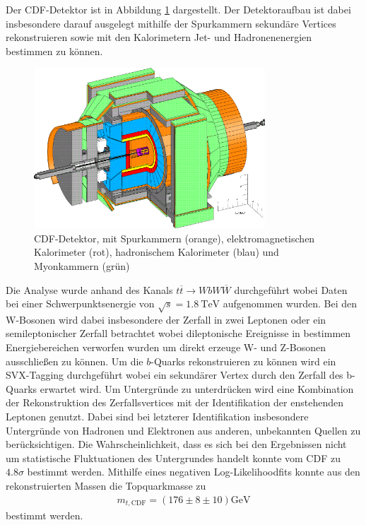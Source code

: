 Der CDF-Detektor ist in Abbildung \ref{fig:cdf} dargestellt.
Der Detektoraufbau ist dabei insbesondere darauf ausgelegt mithilfe der Spurkammern sekundäre Vertices rekonstruieren  sowie mit den Kalorimetern Jet- und Hadronenenergien bestimmen zu können.
\begin{figure}
  \centering
  \includegraphics[height=6.0cm]{ressources/cdfii_3d_p1.png}
  \caption{CDF-Detektor, mit Spurkammern (orange), elektromagnetischen Kalorimeter (rot), hadronischem Kalorimeter (blau) und Myonkammern (grün) \cite{Galtieri:2011yd}}
  \label{fig:cdf}
\end{figure}
Die Analyse wurde anhand des Kanals $t \overline{t} \rightarrow W b W \overline{W}$ durchgeführt wobei Daten bei einer Schwerpunktsenergie von $\sqrt{s} = \SI{1.8}{\tera\electronvolt}$ aufgenommen wurden.
Bei den W-Bosonen wird dabei insbesondere der Zerfall in zwei Leptonen oder ein semileptonischer Zerfall betrachtet wobei dileptonische Ereignisse in bestimmen Energiebereichen verworfen wurden um direkt erzeuge W- und Z-Bosonen ausschließen zu können.
Um die $b$-Quarks rekonstruieren zu können wird ein SVX-Tagging durchgeführt wobei ein sekundärer Vertex durch den Zerfall des b-Quarks erwartet wird.
Um Untergründe zu unterdrücken wird eine Kombination der Rekonstruktion des Zerfallsvertices mit der Identifikation der enstehenden Leptonen genutzt.
Dabei sind bei letzterer Identifikation insbesondere Untergründe von Hadronen und Elektronen aus anderen, unbekannten Quellen zu berücksichtigen.
Die Wahrscheinlichkeit, dass es sich bei den Ergebnissen nicht um statistische Fluktuationen des Untergrundes handelt konnte vom CDF zu $\num{4.8}\sigma$ bestimmt werden.
Mithilfe eines negativen Log-Likelihoodfits konnte aus den rekonstruierten Massen die Topquarkmasse zu 
\begin{align*}
	m_{t, \text{CDF}} = \left( \num{176} \pm \num{8} \pm \num{10} \right) \si{\giga\electronvolt}
\end{align*}
bestimmt werden.

